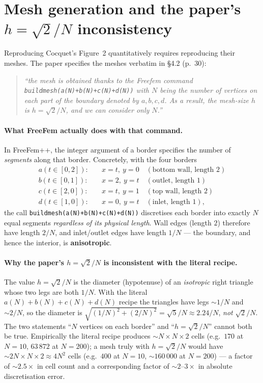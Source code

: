 \documentclass[11pt]{article}
\begin{document}
\section{Mesh generation and the paper's $h=\sqrt2/N$ inconsistency}
\label{sec:mesh-generation}

Reproducing Cocquet's Figure~2 quantitatively requires reproducing their meshes. The paper specifies
the meshes verbatim in \S4.2 (p.~30):
\begin{quote}\itshape
``the mesh is obtained thanks to the Freefem command \texttt{buildmesh(a(N)+b(N)+c(N)+d(N))} with $N$
being the number of vertices on each part of the boundary denoted by $a,b,c,d$. As a result, the mesh-size
$h$ is $h=\sqrt2/N$, and we can consider only $N$.''
\end{quote}

\paragraph{What FreeFem actually does with that command.} In FreeFem++, the integer argument of a border
specifies the number of \emph{segments} along that border. Concretely, with the four borders
\begin{align*}
a(t\in[0,2])\!: &\quad x=t,\ y=0\quad(\text{bottom wall, length }2)\\
b(t\in[0,1])\!: &\quad x=2,\ y=t\quad(\text{outlet, length }1)\\
c(t\in[2,0])\!: &\quad x=t,\ y=1\quad(\text{top wall, length }2)\\
d(t\in[1,0])\!: &\quad x=0,\ y=t\quad(\text{inlet, length }1),
\end{align*}
the call \texttt{buildmesh(a(N)+b(N)+c(N)+d(N))} discretises each border into exactly $N$ equal segments
\emph{regardless of its physical length}. Wall edges (length $2$) therefore have length $2/N$, and
inlet/outlet edges have length $1/N$ --- the boundary, and hence the interior, is \textbf{anisotropic}.

\paragraph{Why the paper's $h=\sqrt2/N$ is inconsistent with the literal recipe.} The value $h=\sqrt2/N$
is the diameter (hypotenuse) of an \emph{isotropic} right triangle whose two legs are both $1/N$. With
the literal $a(N)+b(N)+c(N)+d(N)$ recipe the triangles have legs $\sim1/N$ and $\sim2/N$, so the diameter
is $\sqrt{(1/N)^2+(2/N)^2}=\sqrt5/N\approx2.24/N$, \emph{not} $\sqrt2/N$. The two statements
``$N$ vertices on each border'' and ``$h=\sqrt2/N$'' cannot both be true. Empirically the literal recipe
produces $\sim N\!\times\!N\!\times2$ cells (e.g.\ $170$ at $N=10$, $63\,872$ at $N=200$); a mesh truly
with $h=\sqrt2/N$ would have $\sim2N\!\times\!N\!\times2\approx 4N^2$ cells (e.g.\ $400$ at $N=10$,
$\sim160\,000$ at $N=200$) --- a factor of $\sim 2.5\!\times$ in cell count and a corresponding factor
of $\sim 2$--$3\times$ in absolute discretisation error.
\end{document}
